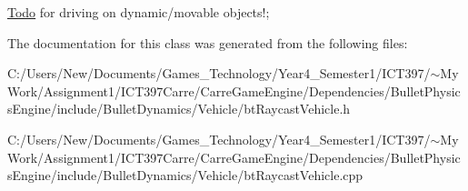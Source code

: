 \begin{Desc}
\item[\hyperlink{todo__todo000038}{Todo}]for driving on dynamic/movable objects!; \end{Desc}


The documentation for this class was generated from the following files:\begin{CompactItemize}
\item 
C:/Users/New/Documents/Games\_\-Technology/Year4\_\-Semester1/ICT397/$\sim$My Work/Assignment1/ICT397Carre/CarreGameEngine/Dependencies/BulletPhysicsEngine/include/BulletDynamics/Vehicle/btRaycastVehicle.h\item 
C:/Users/New/Documents/Games\_\-Technology/Year4\_\-Semester1/ICT397/$\sim$My Work/Assignment1/ICT397Carre/CarreGameEngine/Dependencies/BulletPhysicsEngine/include/BulletDynamics/Vehicle/btRaycastVehicle.cpp\end{CompactItemize}
